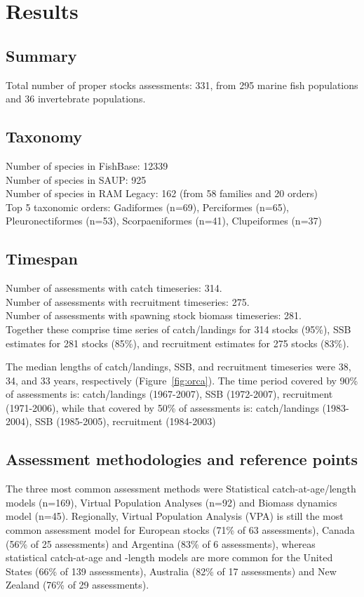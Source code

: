 \section*{Results}
\subsection*{Summary}
\noindent
Total number of proper stocks assessments: 331, from 295 marine fish populations and 36
invertebrate populations.

\subsection*{Taxonomy}
\noindent

Number of species in FishBase: 12339\\
Number of species in SAUP: 925\\
Number of species in RAM Legacy: 162 (from 58 families and 20 orders) \\
Top 5 taxonomic orders: Gadiformes (n=69), Perciformes (n=65), Pleuronectiformes (n=53), Scorpaeniformes (n=41), Clupeiformes (n=37) \\

\subsection*{Timespan}
\noindent
Number of assessments with catch timeseries: 314.\\
Number of assessments with recruitment timeseries: 275.\\
Number of assessments with spawning stock biomass timeseries: 281.\\

Together these comprise time series of
catch/landings for 314 stocks (95\%),
SSB estimates for 281 stocks (85\%), and recruitment estimates for
275 stocks (83\%).

The median lengths of catch/landings, SSB, and recruitment timeseries
were 38, 34, and 33
years, respectively (Figure~\ref{fig:orca}).  The time period covered by 90\% of assessments
is: catch/landings (1967-2007), SSB
(1972-2007), recruitment (1971-2006), while that
covered by 50\% of assessments is: catch/landings
(1983-2004), SSB (1985-2005), recruitment
(1984-2003)
 
\subsection*{Assessment methodologies and reference points}
\noindent
The three most common assessment methods were
Statistical catch-at-age/length models (n=169), Virtual Population Analyses (n=92) and
Biomass dynamics model (n=45). Regionally, Virtual Population Analysis
(VPA) is still the most common assessment model for European stocks
(71\% of 63 assessments),
Canada (56\% of 25
assessments) and Argentina (83\% of
6 assessments), whereas statistical catch-at-age
and -length models are more common for the United States
(66\% of 139 assessments),
Australia (82\% of 17
assessments) and New Zealand (76\% of
29 assessments).

